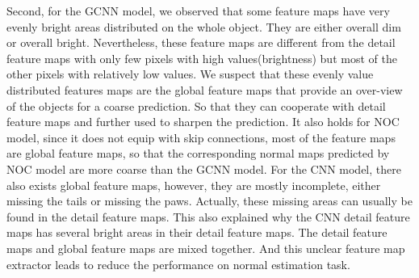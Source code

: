 Second, for the GCNN model,  we observed that some feature maps have very evenly bright areas distributed on the whole object. They are either overall dim or overall bright. Nevertheless, these feature maps are different from the detail feature maps with only few pixels with high values(brightness) but most of the other pixels with relatively low values. We suspect that these evenly value distributed features maps are the global feature maps that provide an over-view of the objects for a coarse prediction. So that they can cooperate with detail feature maps and further used to sharpen the prediction. It also holds for NOC model, since it does not equip with skip connections, most of the feature maps are global feature maps, so that the corresponding normal maps predicted by NOC model are more coarse than the GCNN model. For the CNN model, there also exists global feature maps, however, they are mostly incomplete, either missing the tails or missing the paws. 
Actually, these missing areas can usually be found in the detail feature maps. This also explained why the CNN detail feature maps has several bright areas in their detail feature maps. The detail feature maps and global feature maps are mixed together. And this unclear feature map extractor leads to reduce the performance on normal estimation task.

